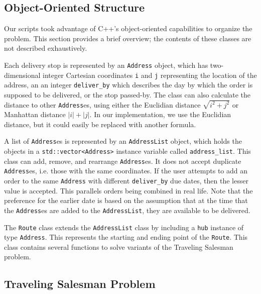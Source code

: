 \documentclass[letterpaper]{article}
\begin{document}
    \subsection{Object-Oriented Structure}
    \label{subsection:Object-Oriented_Structure}
    Our scripts took advantage of C++'s object-oriented capabilities to organize the problem. This section provides a brief overview; the contents of these classes are not described exhaustively.
    
    Each delivery stop is represented by an \verb|Address| object, which has two-dimensional integer Cartesian coordinates \verb|i| and \verb|j| representing the location of the address, an an integer \verb|deliver_by| which describes the day by which the order is supposed to be delivered, or the stop passed-by. The class can also calculate the distance to other \verb|Address|es, using either the Euclidian distance $\sqrt{i^{2} + j^{2}}$ or Manhattan distance $|i| + |j|$. In our implementation, we use the Euclidian distance, but it could easily be replaced with another formula.

    A list of \verb|Address|es is represented by an \verb|AddressList| object, which holds the objects in a \verb|std::vector<Address>| instance variable called \verb|address_list|. This class can add, remove, and rearrange \verb|Address|es. It does not accept duplicate \verb|Address|es, i.e. those with the same coordinates. If the user attempts to add an order to the same \verb|Address| with different \verb|deliver_by| due dates, then the lesser value is accepted. This parallels orders being combined in real life. Note that the preference for the earlier date is based on the assumption that at the time that the \verb|Address|es are added to the \verb|AddressList|, they are available to be delivered.

    The \verb|Route| class extends the \verb|AddressList| class by including a \verb|hub| instance of type \verb|Address|. This represents the starting and ending point of the \verb|Route|. This class contains several functions to solve variants of the Traveling Salesman problem.

    \subsection{Traveling Salesman Problem}
    \label{subsection:Traveling_Salesman_Problem}
\end{document}
